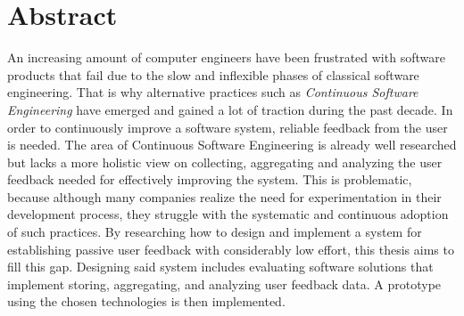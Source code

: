 %
\chapter*{Abstract}
\label{sec:abstract}
\vspace*{-10mm}

An increasing amount of computer engineers have been frustrated with software products that fail due to the slow and inflexible phases of classical software engineering.
That is why alternative practices such as \emph{Continuous Software Engineering} have emerged and gained a lot of traction during the past decade.
In order to continuously improve a software system, reliable feedback from the user is needed.
The area of Continuous Software Engineering is already well researched but lacks a more holistic view on collecting, aggregating and analyzing the user feedback needed for effectively improving the system.
This is problematic, because although many companies realize the need for experimentation in their development process, they struggle with the systematic and continuous adoption of such practices.
By researching how to design and implement a system for establishing passive user feedback with considerably low effort, this thesis aims to fill this gap.
Designing said system includes evaluating software solutions that implement storing, aggregating, and analyzing user feedback data.
A prototype using the chosen technologies is then implemented.
